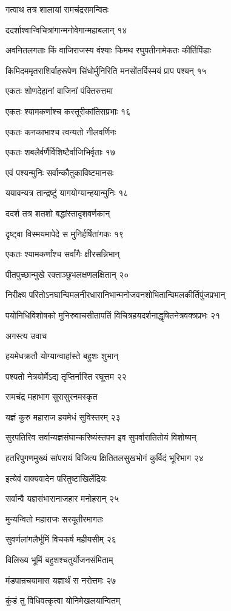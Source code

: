 गत्वाथ तत्र शालायां रामचंद्रसमन्वितः

ददर्शाश्वान्विचित्रांगान्मनोवेगान्महाबलान् १४

अवनितलगताः किं वाजिराजस्य वंश्याः किमथ रघुपतीनामेकतः कीर्तिपिंडाः

किमिदममृतराशिर्वाहरूपेण सिंधोर्मुनिरिति मनसोंतर्विस्मयं प्राप पश्यन् १५

एकतः शोणदेहानां वाजिनां पंक्तिरुत्तमा

एकतः श्यामकर्णाश्च कस्तूरीकांतिसप्रभाः १६

एकतः कनकाभाश्च त्वन्यतो नीलवर्णिनः

एकतः शबलैर्वर्णैर्विशिष्टैर्वाजिभिर्वृताः १७

एवं पश्यन्मुनिः सर्वान्कौतुकाविष्टमानसः

ययावन्यत्र तान्द्रष्टुं यागयोग्यान्हयान्मुनिः १८

ददर्श तत्र शतशो बद्धांस्तादृशवर्णकान्

दृष्ट्वा विस्मयमापेदे स मुनिर्हर्षितांगकः १९

एकतः श्यामकर्णांश्च सर्वांगैः क्षीरसन्निभान्

पीतपुच्छान्मुखे रक्ताञ्छुभलक्षणलक्षितान् २०

निरीक्ष्य परितोऽनघान्विमलनीरधारानिभान्मनोजवनशोभितान्विमलकीर्तिपुंजप्रभान्

पयोनिधिविशोषको मुनिरुवाचसीतापतिं विचित्रहयदर्शनाद्धृषितनेत्रवक्त्रप्रभः २१

अगस्त्य उवाच

हयमेधक्रतौ योग्यान्वाहांस्ते बहुशः शुभान्

पश्यतो नेत्रयोर्मेऽद्य तृप्तिर्नास्ति रघूत्तम २२

रामचंद्र महाभाग सुरासुरनमस्कृत

यज्ञं कुरु महाराज हयमेधं सुविस्तरम् २३

सुरपतिरिव सर्वान्यज्ञसंघान्करिष्यंस्तपन इव सुपर्वारातितोयं विशोष्यन्

हतरिपुगणमुख्यं सांपरायं विजित्य क्षितितलसुखभोगं कुर्विदं भूरिभाग २४

इत्येवं वाक्यवादेन परितुष्टाखिलेंद्रियः

सर्वान्वै यज्ञसंभारानाजहार मनोहरान् २५

मुन्यन्वितो महाराजः सरयूतीरमागतः

सुवर्णलांगलैर्भूमिं विचकर्ष महीयसीम् २६

विलिख्य भूमिं बहुशश्चतुर्योजनसंमिताम्

मंडपान्रचयामास यज्ञार्थं स नरोत्तमः २७

कुंडं तु विधिवत्कृत्वा योनिमेखलयान्वितम्

